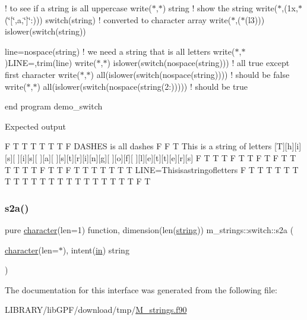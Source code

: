 ! to see if a string is all uppercase write($\ast$,$\ast$) string ! show the string write($\ast$,\textquotesingle{}(1x,$\ast$(\char`\"{}\mbox{[}\char`\"{},a,\char`\"{}\mbox{]}\char`\"{}\+:))\textquotesingle{}) switch(string) ! converted to character array write($\ast$,\textquotesingle{}($\ast$(l3))\textquotesingle{}) islower(switch(string))

line=nospace(string) ! we need a string that is all letters write($\ast$,$\ast$)\textquotesingle{}L\+I\+NE=\textquotesingle{},trim(line) write($\ast$,$\ast$) islower(switch(nospace(string))) ! all true except first character write($\ast$,$\ast$) all(islower(switch(nospace(string)))) ! should be false write($\ast$,$\ast$) all(islower(switch(nospace(string(2\+:))))) ! should be true

end program demo\+\_\+switch

Expected output

F T T T T T T F D\+A\+S\+H\+ES is all dashes F F T This is a string of letters \mbox{[}T\mbox{]}\mbox{[}h\mbox{]}\mbox{[}i\mbox{]}\mbox{[}s\mbox{]}\mbox{[} \mbox{]}\mbox{[}i\mbox{]}\mbox{[}s\mbox{]}\mbox{[} \mbox{]}\mbox{[}a\mbox{]}\mbox{[} \mbox{]}\mbox{[}s\mbox{]}\mbox{[}t\mbox{]}\mbox{[}r\mbox{]}\mbox{[}i\mbox{]}\mbox{[}n\mbox{]}\mbox{[}g\mbox{]}\mbox{[} \mbox{]}\mbox{[}o\mbox{]}\mbox{[}f\mbox{]}\mbox{[} \mbox{]}\mbox{[}l\mbox{]}\mbox{[}e\mbox{]}\mbox{[}t\mbox{]}\mbox{[}t\mbox{]}\mbox{[}e\mbox{]}\mbox{[}r\mbox{]}\mbox{[}s\mbox{]} F T T T F T T F T F T T T T T T F T T F T T T T T T T L\+I\+NE=Thisisastringofletters F T T T T T T T T T T T T T T T T T T T T T F T \mbox{\label{interfacem__strings_1_1switch_a60d3e2ead0b3cfd08eaf61f93d3caf57}} 
\subsubsection{\texorpdfstring{s2a()}{s2a()}}
{\footnotesize\ttfamily pure \hyperlink{option__stopwatch_83_8txt_abd4b21fbbd175834027b5224bfe97e66}{character}(len=1) function, dimension(len(\hyperlink{what__overview_81_8txt_a74cb7e955273b9f9157b4f0c18a38849}{string})) m\+\_\+strings\+::switch\+::s2a (\begin{DoxyParamCaption}\item[{\hyperlink{option__stopwatch_83_8txt_abd4b21fbbd175834027b5224bfe97e66}{character}(len=$\ast$), intent(\hyperlink{M__journal_83_8txt_afce72651d1eed785a2132bee863b2f38}{in})}]{string }\end{DoxyParamCaption})\hspace{0.3cm}{\ttfamily [private]}}



The documentation for this interface was generated from the following file\+:\begin{DoxyCompactItemize}
\item 
L\+I\+B\+R\+A\+R\+Y/lib\+G\+P\+F/download/tmp/\hyperlink{M__strings_8f90}{M\+\_\+strings.\+f90}\end{DoxyCompactItemize}

